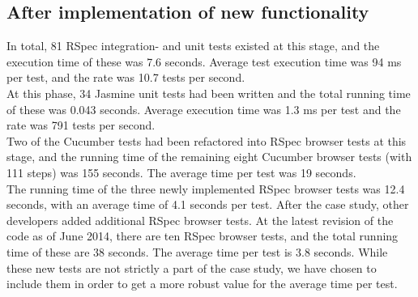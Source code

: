 \subsection{After implementation of new functionality}

In total, 81 RSpec integration- and unit tests existed at this stage,
and the execution time of these was 7.6 seconds. Average test execution
time was 94 ms per test, and the rate was 10.7 tests per
second.\\

At this phase, 34 Jasmine unit tests had been written and the total
running time of these was 0.043 seconds. Average execution time was 1.3
ms per test and the rate was 791 tests per second.\\

Two of the Cucumber tests had been refactored into RSpec browser tests
at this stage, and the running time of the remaining eight Cucumber
browser tests (with 111 steps) was 155 seconds. The average time per
test was 19 seconds.\\

The running time of the three newly implemented RSpec browser tests was
12.4 seconds, with an average time of 4.1 seconds per test. After the
case study, other developers added additional RSpec browser tests.  At
the latest revision of the code as of June 2014, there are ten RSpec
browser tests, and the total running time of these are 38 seconds. The
average time per test is 3.8 seconds. While these new tests are not
strictly a part of the case study, we have chosen to include them in
order to get a more robust value for the average time per test.\\

